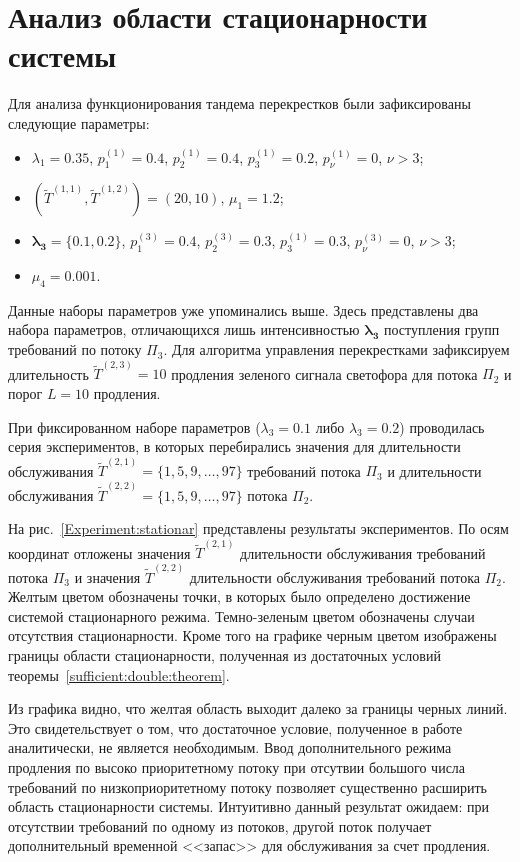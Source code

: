 \section{Анализ области стационарности системы}
Для анализа функционирования тандема перекрестков были зафиксированы следующие параметры:
\begin{itemize}
    \item $\lambda_1=0.35$, $p_{1}^{(1)}=0.4$, $p_{2}^{(1)}=0.4$, $p_{3}^{(1)}=0.2$, $p_{\nu}^{(1)}=0$, $\nu > 3$;
    \item $(\widetilde{T}^{(1,1)}, \widetilde{T}^{(1,2)})=(20,10)$, $\mu_1 = 1.2$;
    \item $\boldsymbol{ \lambda_3=\{0.1, 0.2\}}$, $p_{1}^{(3)}=0.4$, $p_{2}^{(3)}=0.3$, $p_{3}^{(1)}=0.3$, $p_{\nu}^{(3)}=0$, $\nu > 3$;
        \item $\mu_4= 0.001$.
\end{itemize}
Данные наборы параметров уже упоминались выше. Здесь представлены два набора параметров, отличающихся лишь интенсивностью $\boldsymbol{\lambda_3}$ поступления групп требований по потоку $\Pi_3$. Для алгоритма управления перекрестками зафиксируем длительность $\widetilde{T}^{(2,3)}=10$ продления зеленого сигнала светофора для потока $\Pi_2$ и порог $L=10$ продления.

При фиксированном наборе параметров ($\lambda_3 = 0.1$ либо $\lambda_3=0.2$) проводилась серия экспериментов, в которых перебирались значения для длительности обслуживания  $\widetilde{T}^{(2,1)} = \{1, 5, 9, \ldots, 97\}$ требований потока $\Pi_3$ и длительности обслуживания $\widetilde{T}^{(2,2)} = \{1, 5, 9, \ldots, 97\}$ потока $\Pi_2$.

На рис.~\ref{Experiment:stationar} представлены результаты экспериментов. По осям координат отложены значения $\widetilde T^{(2,1)}$ длительности обслуживания требований потока $\Pi_3$ и значения $\widetilde T^{(2,2)}$ длительности обслуживания требований потока $\Pi_2$. Желтым цветом обозначены точки, в которых было определено достижение системой стационарного режима. Темно-зеленым цветом обозначены случаи отсутствия стационарности. Кроме того на графике черным цветом изображены границы области стационарности, полученная из достаточных условий теоремы~\ref{sufficient:double:theorem}. 

Из графика видно, что желтая область выходит далеко за границы черных линий. Это свидетельствует о том, что достаточное условие, полученное в работе аналитически, не является необходимым. Ввод дополнительного режима продления по высоко приоритетному потоку при отсутвии большого числа требований по низкоприоритетному потоку позволяет существенно расширить область стационарности системы. Интуитивно данный результат ожидаем: при отсутствии требований по одному из потоков, другой поток получает дополнительный временной <<запас>> для обслуживания за счет продления.

